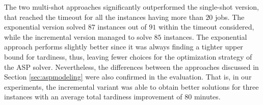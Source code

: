 \documentclass[submission,copyright,creativecommons]{eptcs}
\begin{document}
	
	  

%
The two multi-shot approaches significantly outperformed the single-shot version, that reached the timeout for all the instances having more than $20$ jobs. The exponential version solved $87$ instances out of $91$ within the timeout considered, while the incremental version managed to solve $85$ instances. The exponential approach performs slightly better since it was always finding a tighter upper bound for tardiness, thus, leaving fewer choices for the optimization strategy of the ASP solver. Nevertheless, the differences between the approaches discussed in Section \ref{sec:aspmodeling} were also confirmed in the evaluation. That is, in our experiments, the incremental variant was able to obtain better solutions for three instances with an average total tardiness improvement of 80 minutes.



\end{document}
